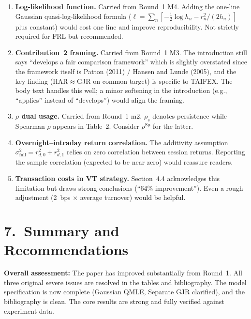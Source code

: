 \documentclass[12pt,a4paper]{article}
\begin{document}
\begin{enumerate}[label=\textbf{m\arabic*}]

\item \textbf{Log-likelihood function.}
Carried from Round~1 M4. Adding the one-line Gaussian quasi-log-likelihood formula ($\ell = \sum_n [-\frac{1}{2}\log h_n - r_n^2/(2h_n)]$ plus constant) would cost one line and improve reproducibility. Not strictly required for FRL but recommended.

\item \textbf{Contribution~2 framing.}
Carried from Round~1 M3. The introduction still says ``develops a fair comparison framework'' which is slightly overstated since the framework itself is Patton (2011) / Hansen and Lunde (2005), and the key finding (HAR$\approx$GJR on common target) is specific to TAIFEX. The body text handles this well; a minor softening in the introduction (e.g., ``applies'' instead of ``develops'') would align the framing.

\item \textbf{$\rho$ dual usage.}
Carried from Round~1 m2. $\rho_s$ denotes persistence while Spearman $\rho$ appears in Table~2. Consider $\rho^{\text{Sp}}$ for the latter.

\item \textbf{Overnight--intraday return correlation.}
The additivity assumption $\sigma^2_{\text{full}} = r^2_{d,0} + r^2_{d,1}$ relies on zero correlation between session returns. Reporting the sample correlation (expected to be near zero) would reassure readers.

\item \textbf{Transaction costs in VT strategy.}
Section~4.4 acknowledges this limitation but draws strong conclusions (``64\% improvement''). Even a rough adjustment (2~bps $\times$ average turnover) would be helpful.

\end{enumerate}


\section*{7.\ Summary and Recommendations}

\textbf{Overall assessment:} The paper has improved substantially from Round~1. All three original severe issues are resolved in the tables and bibliography. The model specification is now complete (Gaussian QMLE, Separate GJR clarified), and the bibliography is clean. The core results are strong and fully verified against experiment data.
\end{document}
